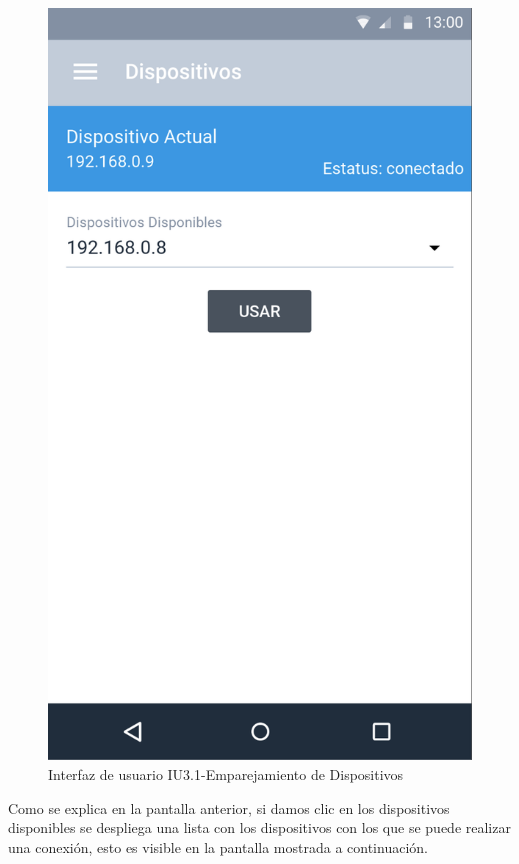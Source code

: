 \begin{figure}[H]
	\centering
	\includegraphics[scale=0.70]{Capitulo4/software/submodulos/images/dispositivos.png}
	\caption{Interfaz de usuario IU3.1-Emparejamiento de Dispositivos}
	\label{fig:Emparejamiento Dispositivos}
\end{figure}

Como se explica en la pantalla anterior, si damos clic en los dispositivos disponibles se despliega una lista con los dispositivos con los que se puede realizar una conexión, esto es visible en la pantalla mostrada a continuación.

